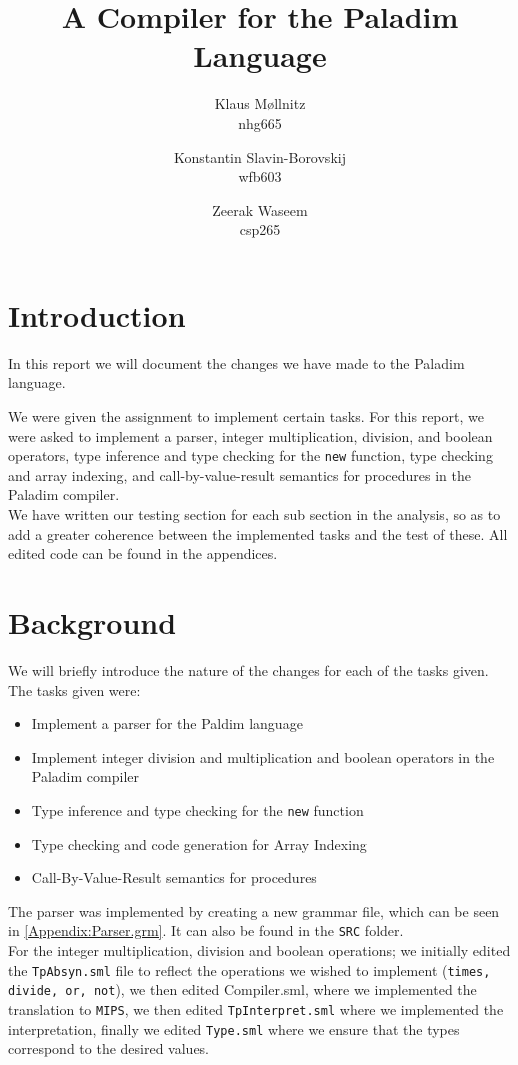 \documentclass[10pt]{article}
\title{A Compiler for the \textbf{Paladim} Language}
\author{
    Klaus Møllnitz\\
    nhg665
  \and
    Konstantin Slavin-Borovskij\\
    wfb603
  \and
    Zeerak Waseem\\
    csp265
}
\begin{document}
\maketitle

\newpage
\tableofcontents
\section{Introduction}
In this report we will document the changes we have made to the Paladim language. 

We were given the assignment to implement certain tasks. For this report, we were asked to implement a parser, integer multiplication, division, and boolean operators, type inference and type checking for the \texttt{new} function, type checking and array indexing, and call-by-value-result semantics for procedures in the Paladim compiler.\\

We have written our testing section for each sub section in the analysis, so as to add a greater coherence between the implemented tasks and the test of these. All edited code can be found in the appendices.

\section{Background}

We will briefly introduce the nature of the changes for each of the tasks given. The tasks given were:
\begin{itemize}
\item Implement a parser for the Paldim language
\item Implement integer division and multiplication and boolean operators in the Paladim compiler
\item Type inference and type checking for the \texttt{new} function
\item Type checking and code generation for Array Indexing
\item Call-By-Value-Result semantics for procedures
\end{itemize}

The parser was implemented by creating a new grammar file, which can be seen in \ref{Appendix:Parser.grm}. It can also be found in the \texttt{SRC} folder.\\

For the integer multiplication, division and boolean operations; we initially edited the \texttt{TpAbsyn.sml} file to reflect the operations we wished to implement (\texttt{times, divide, or, not}), we then edited Compiler.sml, where we implemented the translation to \texttt{MIPS}, we then edited \texttt{TpInterpret.sml} where we implemented the interpretation, finally we edited \texttt{Type.sml} where we ensure that the types correspond to the desired values.\\ 
\end{document}

